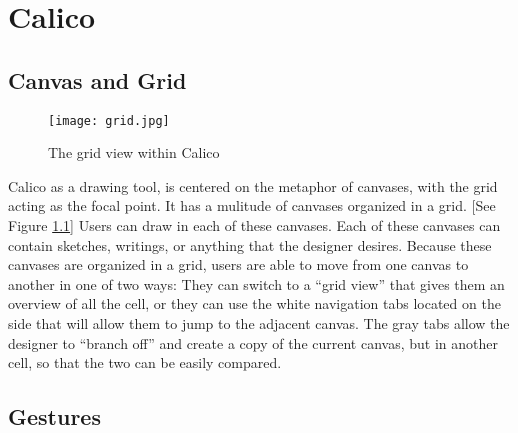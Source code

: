 \chapter{Calico}


\section{Canvas and Grid}

\begin{figure}[htb]
\centering
\texttt{[image: grid.jpg]}
\caption{The grid view within Calico}
\label{fig:grid}
\end{figure}

Calico as a drawing tool, is centered on the metaphor of canvases, with the grid acting as the focal point.
It has a mulitude of canvases organized in a grid. [See Figure \ref{fig:grid}]
Users can draw in each of these canvases.
Each of these canvases can contain sketches, writings, or anything that the designer desires.
Because these canvases are organized in a grid, users are able to move from one canvas to another in one of two ways: They can switch to a ``grid view'' that gives them an overview of all the cell, or they can use the white navigation tabs located on the side that will allow them to jump to the adjacent canvas.
The gray tabs allow the designer to ``branch off'' and create a copy of the current canvas, but in another cell, so that the two can be easily compared.

\section{Gestures}


